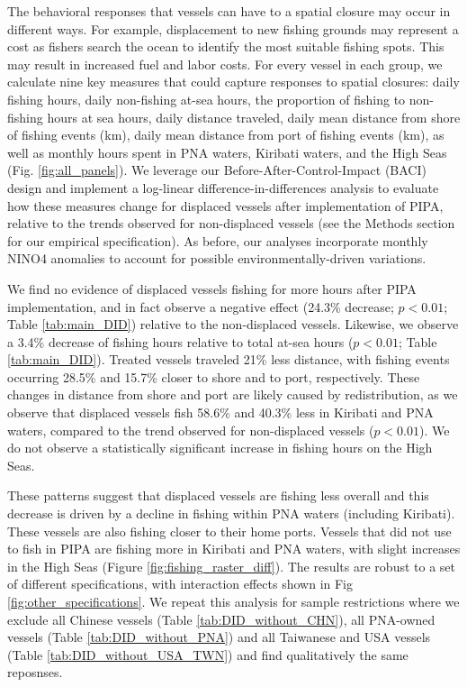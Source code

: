 \documentclass[9p,twocolumn,twoside,lineno]{pnas-new}
\begin{document}
The behavioral responses that vessels can have to a spatial closure may occur in different ways. For example, displacement to new fishing grounds may represent a cost as fishers search the ocean to identify the most suitable fishing spots. This may result in increased fuel and labor costs. For every vessel in each group, we calculate nine key measures that could capture responses to spatial closures: daily fishing hours, daily non-fishing at-sea hours, the proportion of fishing to non-fishing hours at sea hours, daily distance traveled, daily mean distance from shore of fishing events (km), daily mean distance from port of fishing events (km), as well as monthly hours spent in PNA waters, Kiribati waters, and the High Seas (Fig. \ref{fig:all_panels}). We leverage our Before-After-Control-Impact (BACI) design and implement a log-linear difference-in-differences analysis to evaluate how these measures change for displaced vessels after implementation of PIPA, relative to the trends observed for non-displaced vessels (see the Methods section for our empirical specification). As before, our analyses incorporate monthly NINO4 anomalies to account for possible environmentally-driven variations.

We find no evidence of displaced vessels fishing for more hours after PIPA implementation, and in fact observe a negative effect (24.3\% decrease; $p < 0.01$; Table \ref{tab:main_DID}) relative to the non-displaced vessels. Likewise, we observe a 3.4\% decrease of fishing hours relative to total at-sea hours ($p < 0.01$; Table \ref{tab:main_DID}). Treated vessels traveled 21\% less distance, with fishing events occurring 28.5\% and 15.7\% closer to shore and to port, respectively. These changes in distance from shore and port are likely caused by redistribution, as we observe that displaced vessels fish 58.6\% and 40.3\% less in Kiribati and PNA waters, compared to the trend observed for non-displaced vessels ($p < 0.01$). We do not observe a statistically significant increase in fishing hours on the High Seas.

These patterns suggest that displaced vessels are fishing less overall and this decrease is driven by a decline in fishing within PNA waters (including Kiribati). These vessels are also fishing closer to their home ports. Vessels that did not use to fish in PIPA are fishing more in Kiribati and PNA waters, with slight increases in the High Seas (Figure \ref{fig:fishing_raster_diff}). The results are robust to a set of different specifications, with interaction effects shown in Fig  \ref{fig:other_specifications}. We repeat this analysis for sample restrictions where we exclude all Chinese vessels (Table \ref{tab:DID_without_CHN}), all PNA-owned vessels (Table \ref{tab:DID_without_PNA}) and all Taiwanese and USA vessels (Table \ref{tab:DID_without_USA_TWN}) and find qualitatively the same reposnses.
\end{document}
